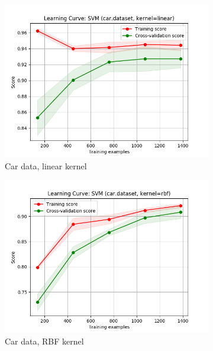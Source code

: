 \documentclass{article}
\begin{document}
    \begin{figure}[htb]
    \centering

    \begin{subfigure}{0.33\textwidth}
      \includegraphics[width=\linewidth]{out/svm/car-kernel-linear.png}
      \caption{Car data, linear kernel}
      \label{fig:svm-learning-1}
    \end{subfigure}\hfil
    \begin{subfigure}{0.33\textwidth}
      \includegraphics[width=\linewidth]{out/svm/car-kernel-rbf.png}
      \caption{Car data, RBF kernel}
      \label{fig:svm-learning-2}
    \end{subfigure}\hfil
    \begin{subfigure}{0.33\textwidth}

\end{subfigure}
\end{figure}
\end{document}
